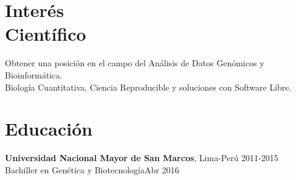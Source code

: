 \documentclass[margin,line]{res}
\begin{document}
	
	\address{Calle Tambo Huascar 201, San Miguel, Lima-Perú}
	\address{avallecam@gmail.com, @avallecam, (+51)950951722}
	
	\begin{resume}
		
		\vspace*{.15in}
		
		\section{\sc Interés \\Científico} %
		
		Obtener una posición en el campo del Análisis de Datos Genómicos y Bioinformática.\\ 
		Biología Cuantitativa, Ciencia Reproducible y soluciones con Software Libre.\\
				
		\section{\sc Educación}
		{\bf Universidad Nacional Mayor de San Marcos}, Lima-Perú \hfill 2011-2015\\
		Bachiller en Genética y Biotecnología\hfill Abr 2016\\
		

\end{resume}
\end{document}
